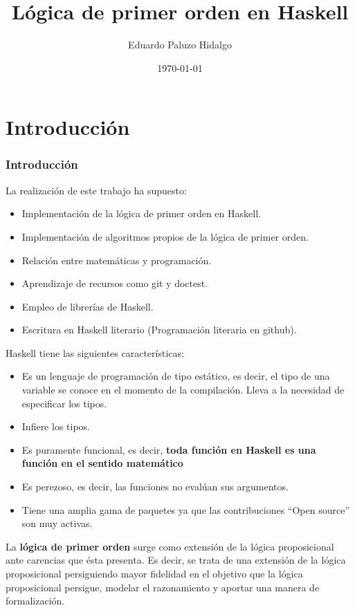 \documentclass[aspectratio=169]{beamer}
\title[LPO en Haskell]{Lógica de primer orden en Haskell}
\author[Eduardo P.]{Eduardo Paluzo Hidalgo}
\institute[US]{Universidad de Sevilla}
\date{\today}
\begin{document}
 
\frame{\titlepage}

\frame{\tableofcontents}
\section{Introducción}
\begin{frame}
  \frametitle{Introducción}
  La realización de este trabajo ha supuesto:
  \begin{itemize}
  \item Implementación de la lógica de primer orden en Haskell.
  \item Implementación de algoritmos propios de la lógica de primer orden.
  \item Relación entre matemáticas y programación.
  \item Aprendizaje de recursos como git y doctest.
  \item Empleo de librerías de Haskell.
  \item Escritura en Haskell literario (Programación literaria en github).
  \end{itemize}
\end{frame}


\begin{frame}
  Haskell tiene las siguientes características:

  \begin{itemize}
  \item Es un lenguaje de programación de tipo estático, es decir, el tipo de una variable
    se conoce en el momento de la compilación. Lleva a la necesidad de especificar los tipos. 
  \item Infiere los tipos.
  \item Es puramente funcional, es decir, \textbf{toda función en Haskell es una función en el sentido matemático}
  \item Es perezoso, es decir, las funciones no evalúan sus argumentos.
  \item Tiene una amplia gama de paquetes ya que las contribuciones ``Open source'' son muy activas. 
  \end{itemize}
\end{frame}

\begin{frame}
  La \textbf{lógica de primer orden} surge como extensión de la lógica proposicional ante carencias que ésta presenta. Es decir, se trata
  de una extensión de la lógica proposicional persiguiendo mayor fidelidad en el objetivo que la lógica proposicional
  persigue, modelar el razonamiento y aportar una manera de formalización.
  
\end{frame}
\end{document}
